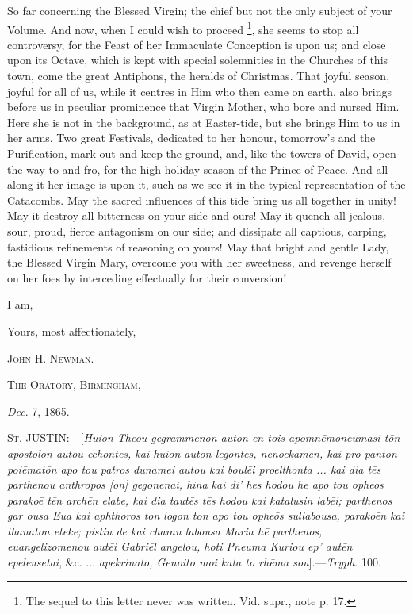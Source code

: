 So far concerning the Blessed Virgin; the chief but not the only
subject of your Volume. And now, when I could wish to proceed \footnote{The sequel to
this letter never was written. Vid. supr., note p. 17.}, she seems to stop all controversy, for the Feast of her
Immaculate Conception is upon us; and close upon its Octave, which is
kept with special solemnities in the Churches of this town, come the
great Antiphons, the heralds of Christmas. That joyful season, joyful
for all of us, while it centres in Him who then came on earth, also
brings before us in peculiar prominence that Virgin Mother, who bore and
nursed Him. Here she is not in the background, as at Easter-tide, but
she brings Him to us in her arms. Two great Festivals, dedicated to her
honour, tomorrow's and the Purification, mark out and keep the ground, and, like the towers of David, open the way to and fro, for the
high holiday season of the Prince of Peace. And all along it her image
is upon it, such as we see it in the typical representation of the
Catacombs. May the sacred influences of this tide bring us all together
in unity! May it destroy all bitterness on your side and ours! May it
quench all jealous, sour, proud, fierce antagonism on our side; and
dissipate all captious, carping, fastidious refinements of reasoning on
yours! May that bright and gentle Lady, the Blessed Virgin Mary,
overcome you with her sweetness, and revenge herself on her foes by
interceding effectually for their conversion!

I am,

Yours, most affectionately,

J\textsc{ohn} H. N\textsc{ewman}.

T\textsc{he} O\textsc{ratory}, B\textsc{irmingham},

\emph{Dec}. 7, 1865.










S\textsc{t}. JUSTIN:—[\emph{Huion
Theou gegrammenon auton en tois apomn\={e}moneumasi t\={o}n
apostol\={o}n
autou echontes, kai huion auton legontes, neno\={e}kamen, kai pro
pant\={o}n poi\={e}mat\={o}n apo tou patros dunamei autou kai
boul\={e}i proelthonta ... kai dia t\={e}s parthenou anthr\={o}pos
[on] gegonenai, hina kai di' h\={e}s hodou h\={e} apo tou ophe\={o}s
parako\={e} t\={e}n arch\={e}n elabe, kai dia taut\={e}s t\={e}s
hodou kai katalusin lab\={e}i; parthenos gar ousa Eua kai aphthoros
ton logon ton apo tou ophe\={o}s sullabousa, parako\={e}n kai
thanaton eteke; pistin de kai charan labousa Maria h\={e} parthenos,
euangelizomenou aut\={e}i Gabri\={e}l angelou, hoti Pneuma Kuriou
ep' aut\={e}n epeleusetai}, \&c. ... \emph{apekrinato, Genoito
moi kata to rh\={e}ma sou}].—\emph{Tryph}. 100.


